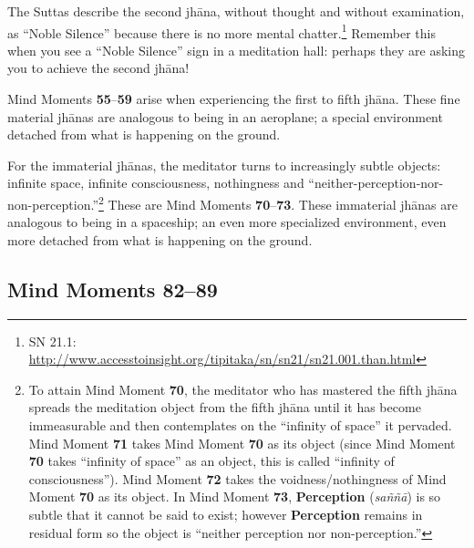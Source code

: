 The Suttas describe the second jhāna, without thought and without examination, as “Noble Silence” because there is no more mental chatter.\footnote{SN 21.1: \url{http://www.accesstoinsight.org/tipitaka/sn/sn21/sn21.001.than.html}} Remember this when you see a “Noble Silence” sign in a meditation hall: perhaps they are asking you to achieve the second jhāna!

Mind Moments \textbf{55}--\textbf{59} arise when experiencing the first to fifth jhāna. These fine material jhānas are analogous to being in an aeroplane; a special environment detached from what is happening on the ground.

For the immaterial jhānas, the meditator turns to increasingly subtle objects: infinite space, infinite consciousness, nothingness and “neither-perception-nor-non-perception.”\footnote{To attain Mind Moment \textbf{70}, the meditator who has mastered the fifth jhāna spreads the meditation object from the fifth jhāna until it has become immeasurable and then contemplates on the “infinity of space” it pervaded. Mind Moment \textbf{71} takes Mind Moment \textbf{70} as its object (since Mind Moment \textbf{70} takes “infinity of space” as an object, this is called “infinity of consciousness”). Mind Moment \textbf{72} takes the voidness/nothingness of Mind Moment \textbf{70} as its object. In Mind Moment \textbf{73}, \textbf{Perception} (\textit{saññā}) is so subtle that it cannot be said to exist; however \textbf{Perception} remains in residual form so the object is “neither perception nor non-perception.”} These are Mind Moments \textbf{70}--\textbf{73}. These immaterial jhānas are analogous to being in a spaceship; an even more specialized environment, even more detached from what is happening on the ground.

\subsection*{Mind Moments 82--89}

